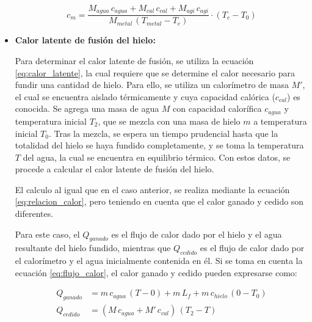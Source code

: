 \documentclass[10pt]{article}
\begin{document}
\begin{multicols*}{2}
\begin{itemize}
              \begin{equation}
                  c_{m} = \frac{M_{agua} \, c_{agua} + M_{cal} \, c_{cal} + M_{agi} \, c_{agi}}{M_{metal} \, (T_{metal} - T_{e})} \cdot (T_{e} - T_{0})
                  \label{eq:calor_especifico}
              \end{equation}

        \item \textbf{Calor latente de fusión del hielo:}

              Para determinar el calor latente de fusión, se utiliza la ecuación
              \ref{eq:calor_latente}, la cual requiere que se determine el calor necesario
              para fundir una cantidad de hielo. Para ello, se utiliza un calorímetro de masa
              $M'$, el cual se encuentra aislado térmicamente y cuya capacidad calórica
              ($c_{cal}$) es conocida. Se agrega una masa de agua $M$ con capacidad
              calorífica $c_{agua}$ y temperatura inicial $T_2$, que se mezcla con una masa
              de hielo $m$ a temperatura inicial $T_0$. Tras la mezcla, se espera un tiempo
              prudencial hasta que la totalidad del hielo se haya fundido completamente, y se
              toma la temperatura $T$ del agua, la cual se encuentra en equilibrio térmico.
              Con estos datos, se procede a calcular el calor latente de fusión del hielo.

              El calculo al igual que en el caso anterior, se realiza mediante la ecuación
              \ref{eq:relacion_calor}, pero teniendo en cuenta que el calor ganado y cedido
              son diferentes.

              Para este caso, el $Q_{ganado}$ es el flujo de calor dado por el hielo y el
              agua resultante del hielo fundido, mientras que $Q_{cedido}$ es el flujo de
              calor dado por el calorímetro y el agua inicialmente contenida en él. Si se
              toma en cuenta la ecuación \ref{eq:flujo_calor}, el calor ganado y cedido
              pueden expresarse como:

              \begin{equation}
                  \begin{split}
                      Q_{ganado} &= m \, c_{agua} \, (T - 0) + m \, L_f + m \, c_{hielo} \, (0 - T_0)\\
                      Q_{cedido} &= (M \, c_{agua} + M' \, c_{cal}) \, (T_2 - T)
                  \end{split}
                  \label{eq:calor_latente_2}
              \end{equation}


\end{itemize}
\end{multicols*}
\end{document}
